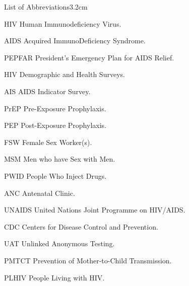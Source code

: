 

\begin{mclistof}{List of Abbreviations}{3.2cm}

\item[HIV] Human Immunodeficiency Virus.
\item[AIDS] Acquired ImmunoDeficiency Syndrome.
\item[PEPFAR] President’s Emergency Plan for AIDS Relief.
\item[HIV] Demographic and Health Surveys.
\item[AIS] AIDS Indicator Survey.
\item[PrEP] Pre-Exposure Prophylaxis.
\item[PEP] Post-Exposure Prophylaxis.
\item[FSW] Female Sex Worker(s).
\item[MSM] Men who have Sex with Men.
\item[PWID] People Who Inject Drugs.
\item[ANC] Antenatal Clinic.
\item[UNAIDS] United Nations Joint Programme on HIV/AIDS.
\item[CDC] Centers for Disease Control and Prevention.
\item[UAT] Unlinked Anonymous Testing.
\item[PMTCT] Prevention of Mother-to-Child Transmission.
\item[PLHIV] People Living with HIV.


\end{mclistof}
